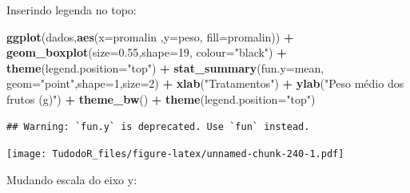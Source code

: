 \documentclass[
]{book}
\newenvironment{Shaded}{\begin{snugshade}}{\end{snugshade}}
\newcommand{\DataTypeTok}[1]{\textcolor[rgb]{0.13,0.29,0.53}{#1}}
\newcommand{\DecValTok}[1]{\textcolor[rgb]{0.00,0.00,0.81}{#1}}
\newcommand{\FloatTok}[1]{\textcolor[rgb]{0.00,0.00,0.81}{#1}}
\newcommand{\KeywordTok}[1]{\textcolor[rgb]{0.13,0.29,0.53}{\textbf{#1}}}
\newcommand{\NormalTok}[1]{#1}
\newcommand{\OperatorTok}[1]{\textcolor[rgb]{0.81,0.36,0.00}{\textbf{#1}}}
\newcommand{\StringTok}[1]{\textcolor[rgb]{0.31,0.60,0.02}{#1}}
\begin{document}
Inserindo legenda no topo:

\begin{Shaded}
\begin{Highlighting}[]
\KeywordTok{ggplot}\NormalTok{(dados,}\KeywordTok{aes}\NormalTok{(}\DataTypeTok{x=}\NormalTok{promalin ,}\DataTypeTok{y=}\NormalTok{peso, }\DataTypeTok{fill=}\NormalTok{promalin)) }\OperatorTok{+}\StringTok{ }
\StringTok{      }\KeywordTok{geom_boxplot}\NormalTok{(}\DataTypeTok{size=}\FloatTok{0.55}\NormalTok{,}\DataTypeTok{shape=}\DecValTok{19}\NormalTok{, }\DataTypeTok{colour=}\StringTok{"black"}\NormalTok{) }\OperatorTok{+}\StringTok{ }
\StringTok{      }\KeywordTok{theme}\NormalTok{(}\DataTypeTok{legend.position=}\StringTok{"top"}\NormalTok{) }\OperatorTok{+}\StringTok{ }
\StringTok{      }\KeywordTok{stat_summary}\NormalTok{(}\DataTypeTok{fun.y=}\NormalTok{mean, }\DataTypeTok{geom=}\StringTok{"point"}\NormalTok{,}\DataTypeTok{shape=}\DecValTok{1}\NormalTok{,}\DataTypeTok{size=}\DecValTok{2}\NormalTok{) }\OperatorTok{+}\StringTok{ }
\StringTok{      }\KeywordTok{xlab}\NormalTok{(}\StringTok{"Tratamentos"}\NormalTok{) }\OperatorTok{+}\StringTok{  }
\StringTok{      }\KeywordTok{ylab}\NormalTok{(}\StringTok{"Peso médio dos frutos (g)"}\NormalTok{)  }\OperatorTok{+}
\StringTok{      }\KeywordTok{theme_bw}\NormalTok{() }\OperatorTok{+}
\StringTok{      }\KeywordTok{theme}\NormalTok{(}\DataTypeTok{legend.position=}\StringTok{"top"}\NormalTok{) }
\end{Highlighting}
\end{Shaded}

\begin{verbatim}
## Warning: `fun.y` is deprecated. Use `fun` instead.
\end{verbatim}

\texttt{[image: TudodoR\_files/figure-latex/unnamed-chunk-240-1.pdf]}

Mudando escala do eixo y:
\end{document}
